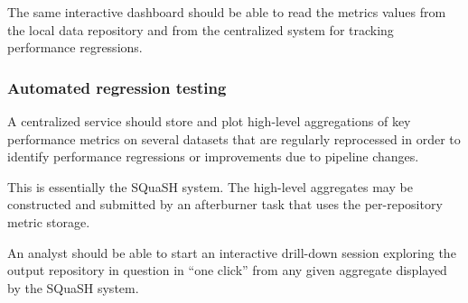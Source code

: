 \begin{recommendation}
The same interactive dashboard should be able to read the metrics values from the local data repository and from the centralized system for tracking performance regressions.
\end{recommendation}


\subsubsection{Automated regression testing} \label{sec:regression}


\begin{recommendation}
A centralized service should store and plot high-level aggregations of key performance metrics on several datasets that are regularly reprocessed in order to identify performance regressions or improvements due to pipeline changes.
\end{recommendation}

This is essentially the SQuaSH system.
The high-level aggregates may be constructed and submitted by an afterburner task that uses the per-repository metric storage.

\begin{recommendation}
An analyst should be able to start an interactive drill-down session exploring the output repository in question in ``one click'' from any given aggregate displayed by the SQuaSH system.
\end{recommendation}
